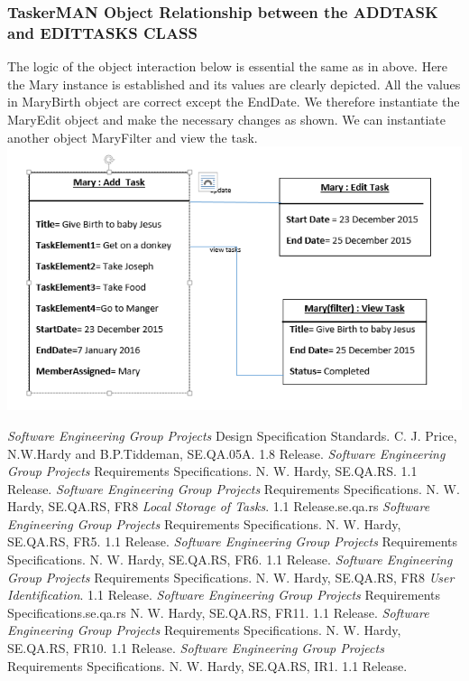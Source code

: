 \documentclass{project}
\begin{document}
\subsubsection{TaskerMAN Object Relationship between the ADD\textunderscore TASK and EDIT\textunderscore TASKS CLASS}
The logic of the object interaction below is essential the same as in above. Here the Mary instance is established and its values are clearly depicted.  All the values in MaryBirth object are correct except the EndDate.  We therefore instantiate the MaryEdit object and make the necessary changes as shown. We can instantiate another object MaryFilter and view the task. \\
\includegraphics[width=1\textwidth, center]{images/Detailed-Design/TaskerMANObjectDiagram2} \\
\begin{thebibliography}{12}
 \emph{Software Engineering Group Projects}
Design Specification Standards.
C. J. Price, N.W.Hardy and B.P.Tiddeman, SE.QA.05A. 1.8 Release.
 \emph{Software Engineering Group Projects}
Requirements Specifications.
N. W. Hardy, SE.QA.RS. 1.1 Release.
 \emph{Software Engineering Group Projects}
Requirements Specifications.
N. W. Hardy, SE.QA.RS, FR8 \emph{Local Storage of Tasks}. 1.1 Release.se.qa.rs
 \emph{Software Engineering Group Projects}
Requirements Specifications.
N. W. Hardy, SE.QA.RS, FR5. 1.1 Release.
 \emph{Software Engineering Group Projects}
Requirements Specifications.
N. W. Hardy, SE.QA.RS, FR6. 1.1 Release.
 \emph{Software Engineering Group Projects}
Requirements Specifications.
N. W. Hardy, SE.QA.RS, FR8 \emph{User Identification}. 1.1 Release.
 \emph{Software Engineering Group Projects}
Requirements Specifications.se.qa.rs
N. W. Hardy, SE.QA.RS, FR11. 1.1 Release.
 \emph{Software Engineering Group Projects}
Requirements Specifications.
N. W. Hardy, SE.QA.RS, FR10. 1.1 Release.
 \emph{Software Engineering Group Projects}
Requirements Specifications.
N. W. Hardy, SE.QA.RS, IR1. 1.1 Release.
\end{thebibliography}
\clearpage
{}
\end{document}
